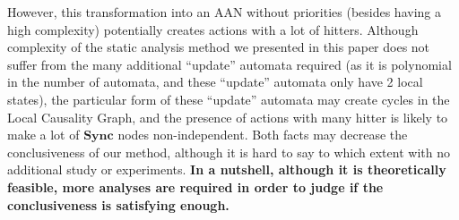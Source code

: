 \documentclass[11pt]{article}
\begin{document}
{\begin{itemize}
    However, this transformation into an AAN without priorities (besides having a high complexity)
    potentially creates actions with a lot of hitters.
    Although complexity of the static analysis method we presented in this paper does not suffer from the many additional “update” automata required (as it is polynomial in the number of automata, and these “update” automata only have 2 local states),
    the particular form of these “update” automata may create cycles in the Local Causality Graph,
    and the presence of actions with many hitter is likely to make a lot of $\mathbf{Sync}$ nodes non-independent.
    Both facts may decrease the conclusiveness of our method, although it is hard to say to which extent with no additional study or experiments.
    \textbf{In a nutshell, although it is theoretically feasible, more analyses are required in order to judge if the conclusiveness is satisfying enough.}
\end{itemize}
}
\end{document}
